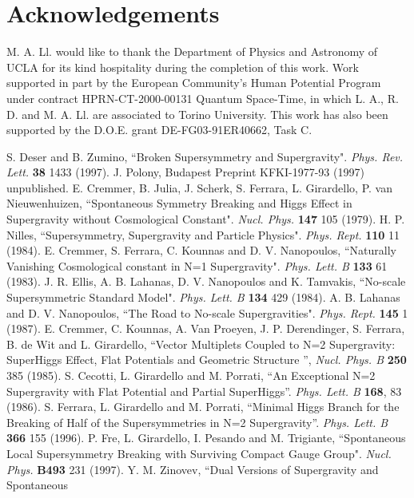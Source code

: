 \documentclass[a4paper,12pt]{article}
\begin{document}
\section*{Acknowledgements}
 M. A. Ll. would like to thank the Department of Physics and Astronomy of UCLA for its
kind hospitality during the  completion of this work. Work
supported in part by the European Community's Human Potential
Program under contract HPRN-CT-2000-00131 Quantum Space-Time, in
which L. A.,  R. D. and M. A. Ll. are associated to Torino
University. This work has also  been supported by the
D.O.E. grant DE-FG03-91ER40662, Task C.
\begin{thebibliography}{99}
 S. Deser and B. Zumino, ``Broken Supersymmetry and Supergravity". {\it Phys. Rev.
Lett.} {\bf 38} 1433 (1997).
 J. Polony, Budapest Preprint KFKI-1977-93 (1997) unpublished.
 E. Cremmer, B. Julia, J. Scherk, S. Ferrara, L. Girardello, P. van
Nieuwenhuizen, ``Spontaneous Symmetry Breaking and Higgs Effect in Supergravity without
Cosmological Constant". {\it Nucl. Phys.} {\bf 147} 105 (1979).
 H. P. Nilles, ``Supersymmetry, Supergravity and Particle Physics". {\it Phys.
Rept.} {\bf 110} 11 (1984).
E. Cremmer, S. Ferrara, C. Kounnas and D. V. Nanopoulos, ``Naturally Vanishing Cosmological
constant in N=1 Supergravity".
{\it Phys. Lett. B} {\bf 133} 61 (1983).
J. R. Ellis, A. B. Lahanas, D. V. Nanopoulos and K. Tamvakis, ``No-scale Supersymmetric
Standard Model". {\it  Phys. Lett. B }
{\bf 134} 429 (1984).
 A. B. Lahanas and D. V. Nanopoulos, ``The Road to No-scale Supergravities". {\it
Phys. Rept.} {\bf 145} 1 (1987).
E. Cremmer, C. Kounnas, A. Van Proeyen, J. P. Derendinger, S.
Ferrara, B. de Wit and L. Girardello, ``Vector Multiplets Coupled
to N=2 Supergravity: SuperHiggs Effect, Flat Potentials and
Geometric Structure '', {\it  Nucl. Phys. B} {\bf 250} 385 (1985).
S. Cecotti, L. Girardello and M. Porrati, ``An Exceptional N=2
Supergravity with Flat Potential and Partial SuperHiggs''. {\it
Phys. Lett. B} {\bf 168}, 83 (1986).
S. Ferrara, L. Girardello and M. Porrati, ``Minimal Higgs Branch
for the Breaking of Half of the Supersymmetries in N=2
Supergravity''. {\it Phys. Lett. B} {\bf 366}  155 (1996).
P. Fre, L. Girardello, I. Pesando and M. Trigiante, ``Spontaneous \coordHE{} Local
Supersymmetry Breaking with Surviving Compact Gauge Group". {\it Nucl. Phys.} {\bf B493}  231
(1997).
 Y. M. Zinovev, ``Dual Versions of \coordHE{} Supergravity and Spontaneous

\end{thebibliography}
\end{document}
